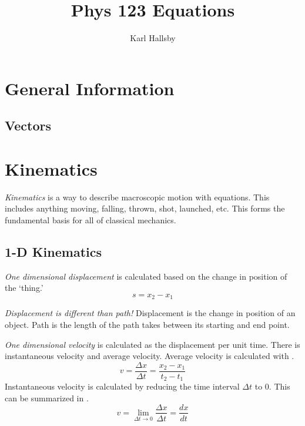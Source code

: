 \documentclass[10pt,letterpaper,final,twoside,notitlepage]{article}
\author{Karl Hallsby}
\title{Phys 123 Equations}
\begin{document}
\tableofcontents
\clearpage
{} %

\section{General Information} \label{sec:General Info}
\subsection{Vectors} \label{subsec:Vectors}

\section{Kinematics} \label{sec:Kinematics}
\begin{definition}[Kinematics]
  \emph{Kinematics} is a way to describe macroscopic motion with equations.
  This includes anything moving, falling, thrown, shot, launched, etc.
  This forms the fundamental basis for all of classical mechanics.
\end{definition}

\subsection{1-D Kinematics} \label{subsec:1D Kinematics}
\begin{definition}[1-D Displacement] \label{def:1D Displacement}
  \emph{One dimensional displacement} is calculated based on the change in position of the `thing.'
  \begin{equation} \label{eq:1D Displacement}
    s = x_{2} - x_{1}
  \end{equation}
  \begin{remark}
    \emph{Displacement is different than path!}
    Displacement is the change in position of an object.
    Path is the length of the path takes between its starting and end point.
  \end{remark}
\end{definition}

\begin{definition}[1-D Velocity] \label{def:1D Velocity}
  \emph{One dimensional velocity} is calculated as the displacement per unit time.
  There is instantaneous velocity and average velocity.
  Average velocity is calculated with .
  \begin{equation} \label{eq:1D Average Velocity}
    v = \frac{\Delta x}{\Delta t} = \frac{x_{2}-x_{1}}{t_{2}-t_{1}}
  \end{equation}
  Instantaneous velocity is calculated by reducing the time interval $\Delta t$ to 0.
  This can be summarized in .
  \begin{equation} \label{eq:1D Instantaneous Velocity}
    v = \lim\limits_{\Delta t \rightarrow 0} \frac{\Delta x}{\Delta t} = \frac{dx}{dt}
  \end{equation}
\end{definition}
\end{document}
